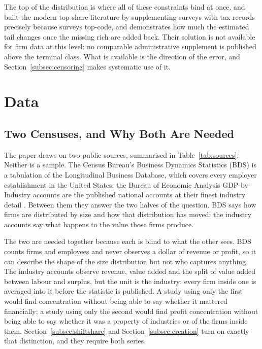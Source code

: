 \documentclass[jrfm,article,submit,pdftex,moreauthors]{Definitions/mdpi}
\begin{document}
The top of the distribution is where all of these constraints bind at once.
\citet{PikettySaez2003} and \citet{SaezZucman2016} built the modern top-share literature by
supplementing surveys with tax records precisely because surveys top-code, and
\citet{Vermeulen2018} demonstrates how much the estimated tail changes once the missing rich
are added back. Their solution is not available for firm data at this level: no comparable
administrative supplement is published above the terminal class. What is available is the
direction of the error, and Section~\ref{subsec:censoring} makes systematic use of it.

\section{Data}
\label{sec:data}

\subsection{Two Censuses, and Why Both Are Needed}
\label{subsec:two}

The paper draws on two public sources, summarised in Table~\ref{tab:sources}. Neither is a
sample. The Census Bureau's Business Dynamics Statistics (BDS) is a tabulation of the
Longitudinal Business Database, which covers every employer establishment in the United
States; the Bureau of Economic Analysis GDP-by-Industry accounts are the published national
accounts at their finest industry detail \citep{CensusBDS2024, BEAIndustry2024}. Between them they answer the two halves of the
question. BDS says how firms are distributed by size and how that distribution has moved;
the industry accounts say what happens to the value those firms produce.

The two are needed together because each is blind to what the other sees. BDS counts firms
and employees and never observes a dollar of revenue or profit, so it can describe the shape
of the size distribution but not who captures anything. The industry accounts observe
revenue, value added and the split of value added between labour and surplus, but the unit
is the industry: every firm inside one is averaged into it before the statistic is
published. A study using only the first would find concentration without being able to say
whether it mattered financially; a study using only the second would find profit
concentration without being able to say whether it was a property of industries or of the
firms inside them. Section~\ref{subsec:shiftshare} and Section~\ref{subsec:creation} turn
on exactly that distinction, and they require both series.
\end{document}
